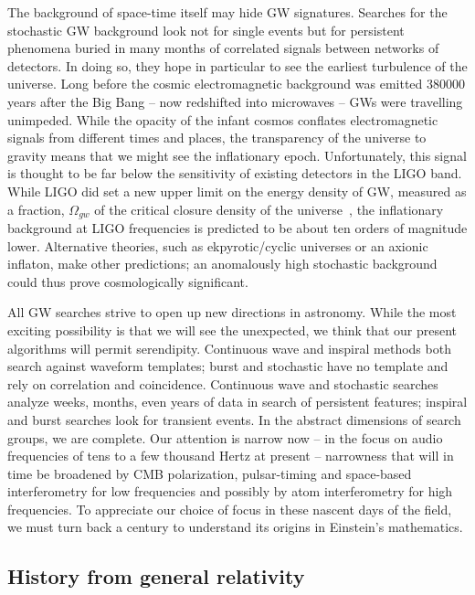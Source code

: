 The background of space-time itself may hide GW signatures. 
Searches for the stochastic GW background look not for single events but for persistent phenomena buried in many months of correlated signals between networks of detectors. 
In doing so, they hope in particular to see the earliest turbulence of the universe.
 Long before the cosmic electromagnetic background was emitted 380000 years after the Big Bang -- now redshifted into microwaves -- GWs were travelling unimpeded. 
While the opacity of the infant cosmos conflates electromagnetic signals from different times and places, the transparency of the universe to gravity means that we might see the inflationary epoch. 
Unfortunately, this signal is thought to be far below the sensitivity of existing detectors in the LIGO band. 
While LIGO did set a new upper limit on the energy density of GW, measured as a fraction, $\Omega_{gw}$ of the critical closure density of the universe~\cite{LIGOStochasticNature2009}, the inflationary background at LIGO frequencies is predicted to be about ten orders of magnitude lower. 
Alternative theories, such as ekpyrotic/cyclic universes or an axionic inflaton, make other predictions; an anomalously high stochastic background could thus prove cosmologically significant.

All GW searches strive to open up new directions in astronomy. 
While the most exciting possibility is that we will see the unexpected, we think that our present algorithms will permit serendipity. 
Continuous wave and inspiral methods both search against waveform templates; burst and stochastic have no template and rely on correlation and coincidence. 
Continuous wave and stochastic searches analyze weeks, months, even years of data in search of persistent features; inspiral and burst searches look for transient events. 
In the abstract dimensions of search groups, we are complete. 
Our attention is narrow now -- in the focus on audio frequencies of tens to a few thousand Hertz at present -- narrowness that will in time be broadened by CMB polarization, pulsar-timing and space-based interferometry for low frequencies and possibly by atom interferometry for high frequencies. 
To appreciate our choice of focus in these nascent days of the field, we must turn back a century to understand its origins in Einstein's mathematics.

        \subsection{History from general relativity}
        \label{history_GR}

